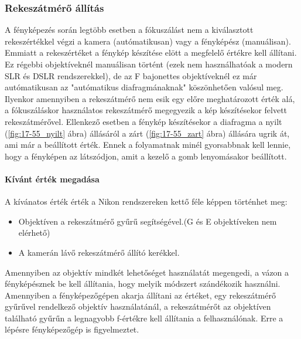 \subsubsection{Rekeszátmérő állítás}
A fényképezés során legtöbb esetben a fókuszálást nem a kiválasztott rekeszértékkel végzi a kamera (autómatikusan) vagy a fényképész (manuálisan). Emmiatt a rekeszértéket a fénykép készítése elött a megfelelő értékre kell állítani. Ez régebbi objektíveknél manuálisan történt (ezek nem használhatóak a modern SLR és DSLR rendszerekkel), de az F bajonettes objektíveknél ez már autómatikusan az "autómatikus diafragmánaknak" köszönhetően valósul meg. Ilyenkor amennyiben a rekeszátmérő nem esik egy előre meghatározott érték alá, a fókuszáláskor használatos rekeszátmérő megegyezik a kép készítésekor felvett rekeszátmérővel. Ellenkező esetben a fénykép készítésekor a diafragma a nyilt (\ref{fig:17-55_nyilt} ábra) állásáról a zárt (\ref{fig:17-55_zart} ábra) állására ugrik át, ami már a beállított érték. Ennek a folyamatnak minél gyorsabbnak kell lennie, hogy a fényképen az látszódjon, amit a kezelő a gomb lenyomásakor beállított. \cite{Practical_design_considerations_for_modern_photographic_optics}
\paragraph{Kívánt érték megadása}
A kívánatos érték érték a Nikon rendszereken kettő féle képpen történhet meg:
\begin{itemize}
    \item Objektíven a rekeszátmérő gyűrű segítségével.(G és E objektíveken nem elérhető)
    \item A kamerán lávő rekeszátmérő állító kerékkel.
\end{itemize}
Amennyiben az objektív mindkét lehetőséget használatát megengedi, a vázon a fényképésznek be kell állítania, hogy melyik módszert szándékozik használni. Amennyiben a fényképezőgépen akarja állítani az értéket, egy rekeszátmérő gyűrűvel rendelkező objektív használatánál, a rekeszátmérőt az objektíven található gyűrűn a legnagyobb f-értékre kell állítania a felhasználónak. Erre a lépésre fényképezőgép is figyelmeztet.\cite{Nikon_D6_referencia_használati_utasítás}

